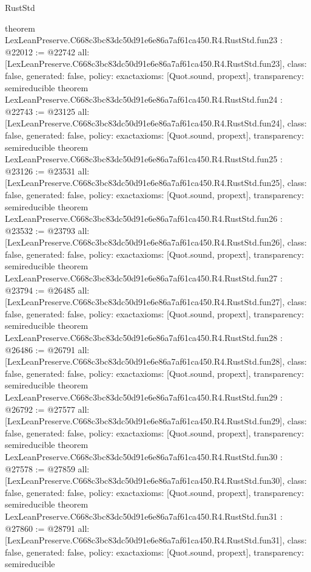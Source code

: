 \begin{lexlean}{RustStd}
\begin{coremodule}
{}
theorem LexLeanPreserve.C668c3bc83dc50d91e6e86a7af61ca450.R4.RustStd.fun23 : @22012 := @22742 {
  all: [LexLeanPreserve.C668c3bc83dc50d91e6e86a7af61ca450.R4.RustStd.fun23],
  class: false,
  generated: false,
  policy: exact{axioms: [Quot.sound, propext]},
  transparency: semireducible
}
theorem LexLeanPreserve.C668c3bc83dc50d91e6e86a7af61ca450.R4.RustStd.fun24 : @22743 := @23125 {
  all: [LexLeanPreserve.C668c3bc83dc50d91e6e86a7af61ca450.R4.RustStd.fun24],
  class: false,
  generated: false,
  policy: exact{axioms: [Quot.sound, propext]},
  transparency: semireducible
}
theorem LexLeanPreserve.C668c3bc83dc50d91e6e86a7af61ca450.R4.RustStd.fun25 : @23126 := @23531 {
  all: [LexLeanPreserve.C668c3bc83dc50d91e6e86a7af61ca450.R4.RustStd.fun25],
  class: false,
  generated: false,
  policy: exact{axioms: [Quot.sound, propext]},
  transparency: semireducible
}
theorem LexLeanPreserve.C668c3bc83dc50d91e6e86a7af61ca450.R4.RustStd.fun26 : @23532 := @23793 {
  all: [LexLeanPreserve.C668c3bc83dc50d91e6e86a7af61ca450.R4.RustStd.fun26],
  class: false,
  generated: false,
  policy: exact{axioms: [Quot.sound, propext]},
  transparency: semireducible
}
theorem LexLeanPreserve.C668c3bc83dc50d91e6e86a7af61ca450.R4.RustStd.fun27 : @23794 := @26485 {
  all: [LexLeanPreserve.C668c3bc83dc50d91e6e86a7af61ca450.R4.RustStd.fun27],
  class: false,
  generated: false,
  policy: exact{axioms: [Quot.sound, propext]},
  transparency: semireducible
}
theorem LexLeanPreserve.C668c3bc83dc50d91e6e86a7af61ca450.R4.RustStd.fun28 : @26486 := @26791 {
  all: [LexLeanPreserve.C668c3bc83dc50d91e6e86a7af61ca450.R4.RustStd.fun28],
  class: false,
  generated: false,
  policy: exact{axioms: [Quot.sound, propext]},
  transparency: semireducible
}
theorem LexLeanPreserve.C668c3bc83dc50d91e6e86a7af61ca450.R4.RustStd.fun29 : @26792 := @27577 {
  all: [LexLeanPreserve.C668c3bc83dc50d91e6e86a7af61ca450.R4.RustStd.fun29],
  class: false,
  generated: false,
  policy: exact{axioms: [Quot.sound, propext]},
  transparency: semireducible
}
theorem LexLeanPreserve.C668c3bc83dc50d91e6e86a7af61ca450.R4.RustStd.fun30 : @27578 := @27859 {
  all: [LexLeanPreserve.C668c3bc83dc50d91e6e86a7af61ca450.R4.RustStd.fun30],
  class: false,
  generated: false,
  policy: exact{axioms: [Quot.sound, propext]},
  transparency: semireducible
}
theorem LexLeanPreserve.C668c3bc83dc50d91e6e86a7af61ca450.R4.RustStd.fun31 : @27860 := @28791 {
  all: [LexLeanPreserve.C668c3bc83dc50d91e6e86a7af61ca450.R4.RustStd.fun31],
  class: false,
  generated: false,
  policy: exact{axioms: [Quot.sound, propext]},
  transparency: semireducible
}
\end{coremodule}
\end{lexlean}
